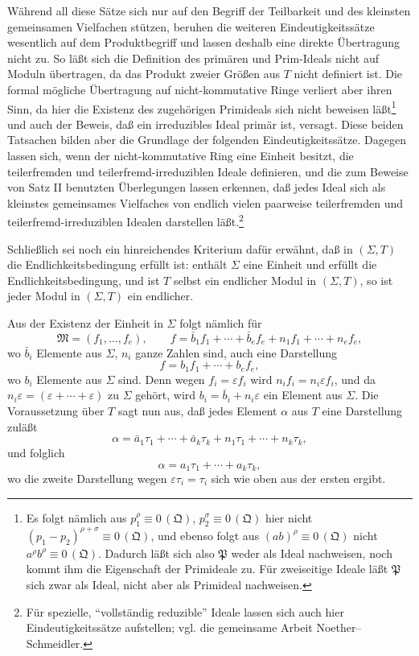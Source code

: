 \documentclass[11pt]{article}
\newcommand{\ideal}[1]{\mathfrak{#1}}
\newcommand{\eqzero}[1]{\equiv 0\,(#1)}
\begin{document}
Während all diese Sätze sich nur auf den Begriff der Teilbarkeit und des kleinsten gemeinsamen Vielfachen stützen, beruhen die weiteren Eindeutigkeitssätze wesentlich auf dem Produktbegriff und lassen deshalb eine direkte Übertragung nicht zu. So läßt sich die Definition des primären und Prim-Ideals nicht auf Moduln übertragen, da das Produkt zweier Größen aus $T$ nicht definiert ist. Die formal mögliche Übertragung auf nicht-kommutative Ringe verliert aber ihren Sinn, da hier die Existenz des zugehörigen Primideals sich nicht beweisen läßt\footnote{Es folgt nämlich aus $p_1^\rho\eqzero{\ideal Q}$, $p_2^\sigma\eqzero{\ideal Q}$ hier nicht $(p_1-p_2)^{\rho+\sigma}\eqzero{\ideal Q}$, und ebenso folgt aus $(ab)^\rho\eqzero{\ideal Q}$ nicht $a^\rho b^\rho\eqzero{\ideal Q}$. Dadurch läßt sich also $\ideal P$ weder als Ideal nachweisen, noch kommt ihm die Eigenschaft der Primideale zu. Für zweiseitige Ideale läßt $\ideal P$ sich zwar als Ideal, nicht aber als Primideal nachweisen.} und auch der Beweis, daß ein irreduzibles Ideal primär ist, versagt. Diese beiden Tatsachen bilden aber die Grundlage der folgenden Eindeutigkeitssätze. Dagegen lassen sich, wenn der nicht-kommutative Ring eine Einheit besitzt, die teilerfremden und teilerfremd-irreduziblen Ideale definieren, und die zum Beweise von Satz II benutzten Überlegungen lassen erkennen, daß jedes Ideal sich als kleinstes gemeinsames Vielfaches von endlich vielen paarweise teilerfremden und teilerfremd-irreduziblen Idealen darstellen läßt.\footnote{Für spezielle, ``vollständig reduzible'' Ideale lassen sich auch hier Eindeutigkeitssätze aufstellen; vgl. die gemeinsame Arbeit Noether--Schmeidler.}

Schließlich sei noch ein hinreichendes Kriterium dafür erwähnt, daß in $(\Sigma,T)$ die Endlichkeitsbedingung erfüllt ist: enthält $\Sigma$ eine Einheit und erfüllt die Endlichkeitsbedingung, und ist $T$ selbst ein endlicher Modul in $(\Sigma,T)$, so ist jeder Modul in $(\Sigma,T)$ ein endlicher.

Aus der Existenz der Einheit in $\Sigma$ folgt nämlich für
\[
 \ideal M=(f_1,
\ldots,f_e),\qquad
 f=\bar b_1f_1+\cdots+\bar b_ef_e+n_1f_1+\cdots+n_ef_e,
\]
wo $\bar b_i$ Elemente aus $\Sigma$, $n_i$ ganze Zahlen sind, auch eine Darstellung
\[
 f=b_1f_1+\cdots+b_ef_e,
\]
wo $b_i$ Elemente aus $\Sigma$ sind. Denn wegen $f_i=\varepsilon f_i$ wird $n_if_i=n_i\varepsilon f_i$, und da $n_i\varepsilon=(\varepsilon+\cdots+\varepsilon)$ zu $\Sigma$ gehört, wird $b_i=\bar b_i+n_i\varepsilon$ ein Element aus $\Sigma$. Die Voraussetzung über $T$ sagt nun aus, daß jedes Element $\alpha$ aus $T$ eine Darstellung zuläßt
\[
 \alpha=\bar a_1\tau_1+\cdots+\bar a_k\tau_k+n_1\tau_1+\cdots+n_k\tau_k,
\]
und folglich
\[
 \alpha=a_1\tau_1+\cdots+a_k\tau_k,
\]
wo die zweite Darstellung wegen $\varepsilon\tau_i=\tau_i$ sich wie oben aus der ersten ergibt.
\end{document}
